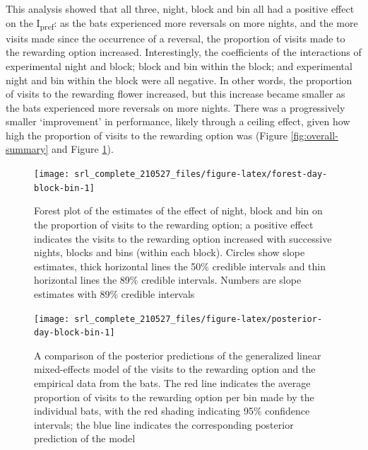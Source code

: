 \documentclass[
]{article}
\begin{document}
This analysis showed that all three, night, block and bin all had a positive effect on the I\textsubscript{pref}: as the bats experienced more reversals on more nights, and the more visits made since the occurrence of a reversal, the proportion of visits made to the rewarding option increased. Interestingly, the coefficients of the interactions of experimental night and block; block and bin within the block; and experimental night and bin within the block were all negative. In other words, the proportion of visits to the rewarding flower increased, but this increase became smaller as the bats experienced more reversals on more nights. There was a progressively smaller `improvement' in performance, likely through a ceiling effect, given how high the proportion of visits to the rewarding option was (Figure \ref{fig:overall-summary} and Figure \ref{fig:forest-day-block-bin}).



\begin{figure}[H]

{\centering \texttt{[image: srl\_complete\_210527\_files/figure-latex/forest-day-block-bin-1]} 

}

\caption{Forest plot of the estimates of the effect of night, block and bin on the proportion of visits to the rewarding option; a positive effect indicates the visits to the rewarding option increased with successive nights, blocks and bins (within each block). Circles show slope estimates, thick horizontal lines the 50\% credible intervals and thin horizontal lines the 89\% credible intervals. Numbers are slope estimates with 89\% credible intervals}\label{fig:forest-day-block-bin}
\end{figure}



\begin{figure}[H]

{\centering \texttt{[image: srl\_complete\_210527\_files/figure-latex/posterior-day-block-bin-1]} 

}

\caption{A comparison of the posterior predictions of the generalized linear mixed-effects model of the visits to the rewarding option and the empirical data from the bats. The red line indicates the average proportion of visits to the rewarding option per bin made by the individual bats, with the red shading indicating 95\% confidence intervals; the blue line indicates the corresponding posterior prediction of the model}\label{fig:posterior-day-block-bin}
\end{figure}
\end{document}
